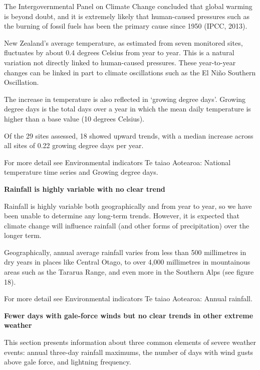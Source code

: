 \documentclass[11pt]{mfe-nzers} %
\begin{document}
The Intergovernmental Panel on Climate Change concluded that global warming is beyond doubt, and it is extremely likely that human-caused pressures such as the burning of fossil fuels has been the primary cause since 1950 (IPCC, 2013).


New Zealand’s average temperature, as estimated from seven monitored sites, fluctuates by about 0.4 degrees Celsius from year to year. This is a natural variation not directly linked to human-caused pressures. These year-to-year changes can be linked in part to climate oscillations such as the El Niño Southern Oscillation.

The increase in temperature is also reflected in ‘growing degree days’. Growing degree days is the total days over a year in which the mean daily temperature is higher than a base value (10 degrees Celsius).

Of the 29 sites assessed, 18 showed upward trends, with a median increase across all sites of 0.22 growing degree days per year.

For more detail see Environmental indicators Te taiao Aotearoa: National temperature time series and Growing degree days.

\textbf{Rainfall is highly variable with no clear trend}

Rainfall is highly variable both geographically and from year to year, so we have been unable to determine any long-term trends. However, it is expected that climate change will influence rainfall (and other forms of precipitation) over the longer term.

Geographically, annual average rainfall varies from less than 500 millimetres in dry years in places like Central Otago, to over 4,000 millimetres in mountainous areas such as the Tararua Range, and even more in the Southern Alps (see figure 18).

For more detail see Environmental indicators Te taiao Aotearoa: Annual rainfall.


\textbf{Fewer days with gale-force winds but no clear trends in other extreme weather}

This section presents information about three common elements of severe weather events: annual three-day rainfall maximums, the number of days with wind gusts above gale force, and lightning frequency.
\end{document}
